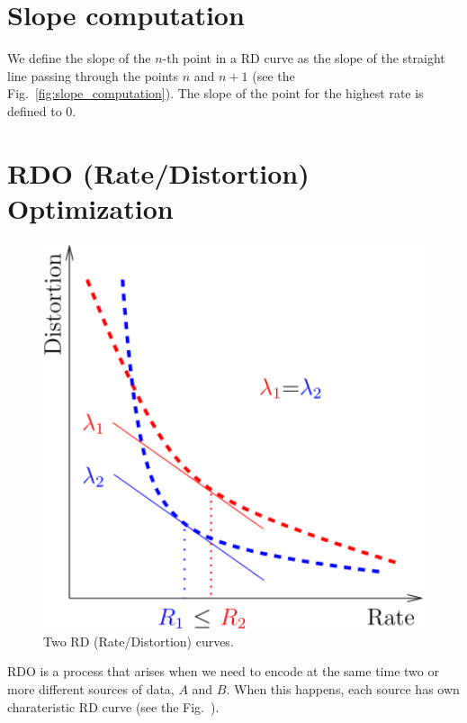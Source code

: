 
\section{Slope computation}
We define the slope of the                            
    $n$-th point in a RD curve as the slope of the straight line                             
    passing through the points $n$ and $n+1$ (see the                                        
    Fig.~\ref{fig:slope_computation}). The slope of the point for the                        
    highest rate is defined to $0$.

\section{RDO (Rate/Distortion) Optimization}

\begin{figure}
  \centering
  \includegraphics[width=1.0\textwidth]{graphics/RD_slopes} 
  \caption{Two RD (Rate/Distortion) curves.}
  \label{fig:RD_slopes}
\end{figure}

RDO is a process that arises when we need to encode at the same time
two or more different sources of data, $A$ and $B$. When this happens,
each source has own charateristic RD curve (see the
Fig.~\cite{RD_slopes}).

